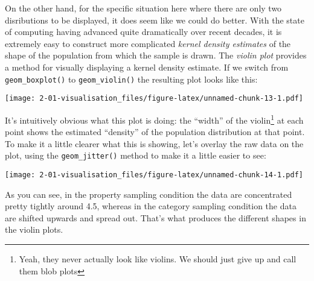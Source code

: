 \documentclass[]{book}
\newenvironment{Shaded}{\begin{snugshade}}{\end{snugshade}}
\newcommand{\DataTypeTok}[1]{\textcolor[rgb]{0.13,0.29,0.53}{#1}}
\newcommand{\KeywordTok}[1]{\textcolor[rgb]{0.13,0.29,0.53}{\textbf{#1}}}
\newcommand{\NormalTok}[1]{#1}
\newcommand{\OperatorTok}[1]{\textcolor[rgb]{0.81,0.36,0.00}{\textbf{#1}}}
\newcommand{\StringTok}[1]{\textcolor[rgb]{0.31,0.60,0.02}{#1}}
\let\rmarkdownfootnote\footnote%
\def\footnote{\protect\rmarkdownfootnote}
\begin{document}
On the other hand, for the specific situation here where there are only two disributions to be displayed, it does seem like we could do better. With the state of computing having advanced quite dramatically over recent decades, it is extremely easy to construct more complicated \emph{kernel density estimates} of the shape of the population from which the sample is drawn. The \emph{violin plot} provides a method for visually displaying a kernel density estimate. If we switch from \texttt{geom\_boxplot()} to \texttt{geom\_violin()} the resulting plot looks like this:

\begin{Shaded}
\end{Shaded}

\texttt{[image: 2-01-visualisation\_files/figure-latex/unnamed-chunk-13-1.pdf]}

It's intuitively obvious what this plot is doing: the ``width'' of the violin\footnote{Yeah, they never actually look like violins. We should just give up and call them blob plots} at each point shows the estimated ``density'' of the population distribution at that point. To make it a little clearer what this is showing, let's overlay the raw data on the plot, using the \texttt{geom\_jitter()} method to make it a little easier to see:

\begin{Shaded}
\end{Shaded}

\texttt{[image: 2-01-visualisation\_files/figure-latex/unnamed-chunk-14-1.pdf]}

As you can see, in the property sampling condition the data are concentrated pretty tightly around 4.5, whereas in the category sampling condition the data are shifted upwards and spread out. That's what produces the different shapes in the violin plots.
\end{document}
